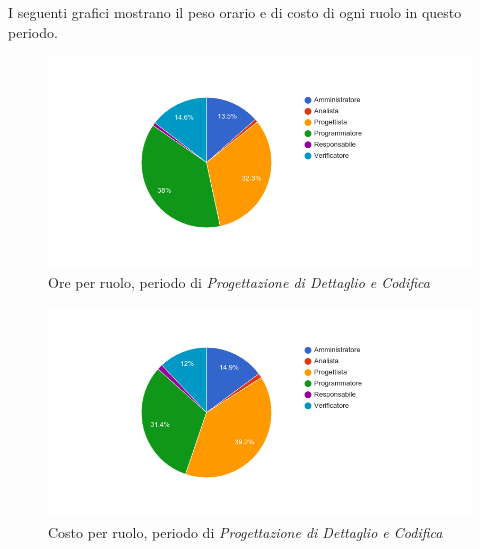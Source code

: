 I seguenti grafici mostrano il peso orario e di costo di ogni ruolo in questo periodo.

\begin{figure}[H]
  \begin{center}
    \includegraphics[width=15cm]{res/img/prospettoEconomico/orePerRuoloProgettazioneDettaglioCodifica.png}
  \caption{Ore per ruolo, periodo di \textit{Progettazione di Dettaglio e Codifica}}
  \end{center} 
\end{figure}  

\begin{figure}[H]
  \begin{center}
    \includegraphics[width=15cm]{res/img/prospettoEconomico/costoPerRuoloProgettazioneDettaglioCodifica.png}
  \caption{Costo per ruolo, periodo di \textit{Progettazione di Dettaglio e Codifica}}
  \end{center} 
\end{figure}  


